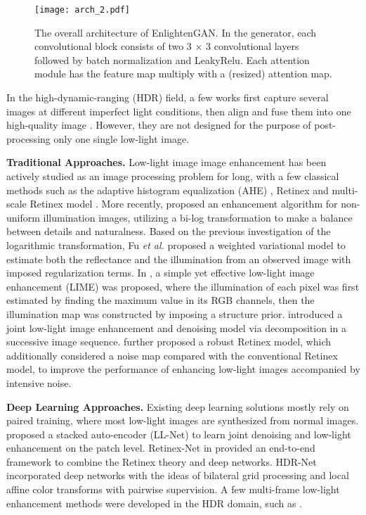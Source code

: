 \documentclass[journal]{IEEEtran}
\begin{document}
\begin{figure*}
\centering
\texttt{[image: arch\_2.pdf]}
\caption{The overall architecture of EnlightenGAN. In the generator, each convolutional block consists of two $3$ $\times$ $3$ convolutional layers followed by batch normalization and LeakyRelu. Each attention module has the feature map multiply with a (resized) attention map.}
\label{fig:architecture}
\end{figure*}



In the high-dynamic-ranging (HDR) field, a few works first capture several images at different imperfect light conditions, then align and fuse them into one high-quality image \cite{kalantari2017deep,wu2018deep}. However, they are not designed for the purpose of post-processing only one single low-light image. 

\noindent\textbf{Traditional Approaches.} Low-light image image enhancement has been actively studied as an image processing problem for long, with a few classical methods such as 
the adaptive histogram equalization (AHE) \cite{pizer1987adaptive}, Retinex \cite{land1977retinex} and multi-scale Retinex model \cite{jobson1997multiscale}. 
More recently, \cite{wang2013naturalness} proposed an enhancement algorithm for non-uniform illumination images, utilizing a bi-log transformation to make a balance between details and naturalness. Based on the previous investigation of the logarithmic transformation, Fu \textit{et al.} proposed a weighted variational model \cite{fu2016weighted} to estimate both the reflectance and the illumination from an observed image with imposed regularization terms. In \cite{guo2017lime}, a simple yet effective low-light image enhancement (LIME) was proposed, where the illumination of each pixel was first estimated by finding the maximum value in its RGB channels, then the illumination map was constructed by imposing a structure prior. \cite{ren2018joint} introduced a joint low-light image enhancement and denoising model via decomposition in a successive image sequence. \cite{li2018structure} further proposed a robust Retinex model, which additionally considered
a noise map compared with the conventional Retinex
model, to improve the performance of enhancing low-light images
accompanied by intensive noise.


\noindent\textbf{Deep Learning Approaches. }
Existing deep learning solutions mostly rely on paired training, where most low-light images are synthesized from normal images. \cite{lore2017llnet} proposed a stacked auto-encoder (LL-Net) to learn joint denoising and low-light enhancement on the patch level. Retinex-Net in \cite{wei2018deep} provided an end-to-end framework to combine the Retinex theory and deep networks. HDR-Net \cite{gharbi2017deep} incorporated deep networks with the ideas of bilateral grid processing and local affine color transforms with pairwise supervision. A few multi-frame low-light enhancement methods were developed in the HDR domain, such as \cite{kalantari2017deep,wu2018deep,cai2018learning}. 
\end{document}
